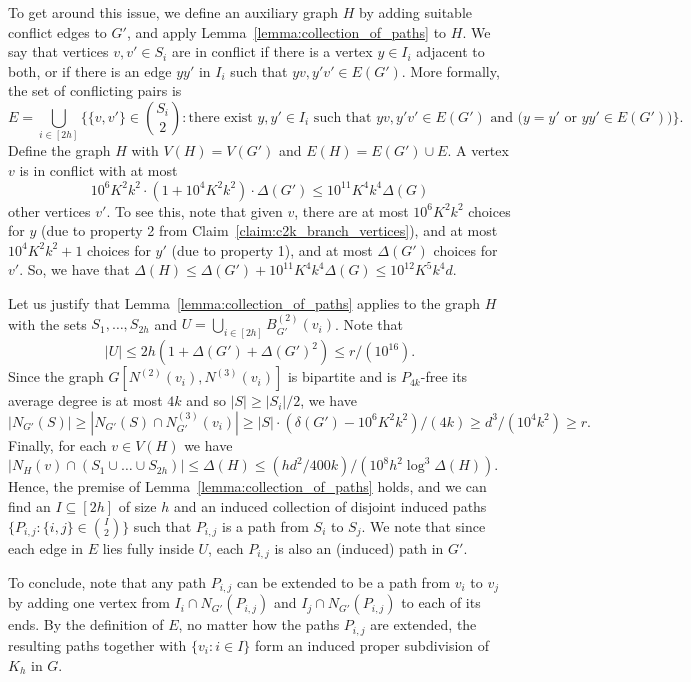 \documentclass[10pt, a4paper]{article}
\numberwithin{theorem}{section} %
\theoremstyle{remark}
\theoremstyle{definition}
\begin{document}
    To get around this issue, we define an auxiliary graph $H$ by adding suitable conflict edges to $G'$, and apply Lemma~\ref{lemma:collection_of_paths} to $H$.
    We say that vertices $v, v'\in S_i$ are in conflict if there is a vertex $y\in I_i$ adjacent to both, or if there is an edge $yy'$ in $I_i$ such that $yv, y'v'\in E(G')$. More formally, the set of conflicting pairs is
    \[
        E = \!\!\bigcup_{i\in [2h]} \!\Big\{\{v, v'\} \!\in\! \binom{S_i}{2}\! : \text{there exist } y, y'\!\in I_i\text{ such that } yv, y'v'\!\in E(G') \text{ and } \big(y=y' \text{ or }yy'\in E(G')\big)\Big\}.
    \]
    Define the graph $H$ with $V(H) = V(G')$ and $E(H) = E(G') \cup E$. A vertex $v$ is in conflict with at most
    \[
        10^6K^2k^2 \cdot (1 + 10^4K^2k^2)\cdot \Delta(G') \leq 10^{11}K^4k^4\Delta(G)
    \]
    other vertices $v'$. To see this, note that given $v$, there are at most $10^6K^2k^2$ choices for $y$ (due to property 2 from Claim~\ref{claim:c2k_branch_vertices}), and at most $10^4K^2k^2+1$ choices for $y'$ (due to property 1), and at most $\Delta(G')$ choices for $v'$. So, we have that $\Delta(H) \leq \Delta(G') + 10^{11}K^4k^4 \Delta(G) \leq 10^{12}K^5k^4d$.

    Let us justify that Lemma~\ref{lemma:collection_of_paths} applies to the graph $H$ with the sets $S_1, \dots, S_{2h}$ and $U = \bigcup_{i \in [2h]} B^{(2)}_{G'}(v_i)$. Note that
    \[
        |U| \leq 2h (1 + \Delta(G') + \Delta(G')^2) \leq r/(10^{16}).
    \]
    Since the graph $G[N^{(2)}(v_i), N^{(3)}(v_i)]$ is bipartite and is $P_{4k}$-free its average degree is at most $4k$ and so $|S| \geq |S_i|/2$, we have
    \[
        |N_{G'}(S)|\geq |N_{G'}(S)\cap N^{(3)}_{G'}(v_i)| \geq |S| \cdot (\delta(G') - 10^6K^2k^2) / (4k) \geq d^3/(10^4k^2) \geq r.
    \]
    Finally, for each $v \in V(H)$ we have $|N_H(v) \cap (S_1 \cup \dots \cup S_{2h})| \leq \Delta(H) \leq (hd^2/400k)/(10^{8}h^2\log^3\Delta(H))$.
    Hence, the premise of Lemma~\ref{lemma:collection_of_paths} holds, and we can find an $I \subseteq [2h]$ of size $h$ and an induced collection of disjoint induced paths $\{P_{i, j} : \{i, j\} \in \binom{I}{2}\}$ such that $P_{i, j}$ is a path from $S_i$ to $S_j$.
    We note that since each edge in $E$ lies fully inside $U$, each $P_{i, j}$ is also an (induced) path in $G'$.

    To conclude, note that any path $P_{i, j}$ can be extended to be a path from $v_i$ to $v_j$ by adding one vertex from $I_i \cap N_{G'}(P_{i, j})$ and $I_j \cap N_{G'}(P_{i, j})$ to each of its ends. 
    By the definition of $E$, no matter how the paths $P_{i, j}$ are extended, the resulting paths together with $\{v_i : i \in I\}$ form an induced proper subdivision of $K_h$ in $G$.
\end{document}
